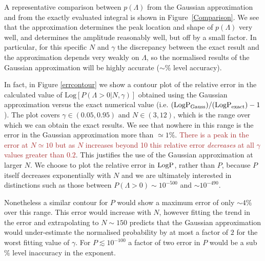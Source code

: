 \documentclass[12pt]{article}
\newcommand{\sh}[1]{\textcolor{brown}{#1}}
\begin{document}

A representative comparison between $p(\Lambda)$ from the Gaussian approximation and from the exactly evaluated integral is shown in Figure~\ref{Comparison}. We see that the approximation determines the peak location and shape of $p(\Lambda)$ very well, and determines the amplitude reasonably well, but off by a small factor. In particular, for this specific $N$ and $\gamma$ the discrepancy between the exact result and the approximation depends very weakly on $\Lambda$, so the normalised results of the Gaussian approximation will be highly accurate ($\sim\%$ level accuracy).

In fact, in Figure \ref{errcontour} we show a contour plot of the relative error in the calculated value of $\mathrm{Log} \left[P(\Lambda>0|N,\gamma)\right]$ obtained using the Gaussian approximation versus the exact numerical value (i.e. $(\rm{Log} P_{\rm Gauss})/(\rm{Log} P_{\rm exact}) -1$). The plot covers $\gamma \in (0.05,0.95)$ and $N \in (3,12)$, which is the range over which we can obtain the exact results. We see that nowhere in this range is the error in the Gaussian approximation more than $\simeq 1\%$. \sh{There is a peak in the error at $N \simeq 10$ but as $N$ increases beyond 10 this relative error \emph{decreases} at all $\gamma$ values greater than $0.2$}. This justifies the use of the Gaussian approximation at larger $N$. We choose to plot the relative error in $\rm{Log} P$, rather than $P$, because $P$ itself decreases exponentially with $N$ and we are ultimately interested in distinctions such as those between $P(\Lambda>0) \sim 10^{-500}$ and $\sim 10^{-490}$.

Nonetheless a similar contour for $P$ would show a maximum error of only $\sim 4\%$ over this range. This error would increase with $N$, however fitting the trend in the error and extrapolating to $N\sim 150$ predicts that the Gaussian approximation would under-estimate the normalised probability by at most a factor of $2$ for the worst fitting value of $\gamma$. For $P\lesssim 10^{-100}$ a factor of two error in $P$ would be a sub $\%$ level inaccuracy in the exponent.
\end{document}
